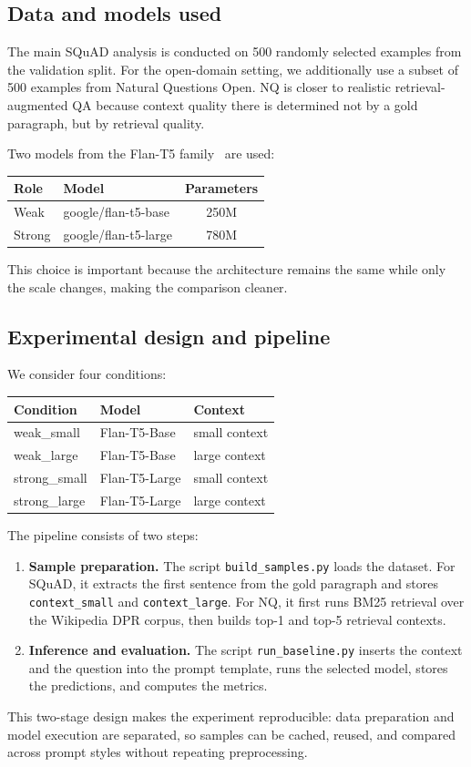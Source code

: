 \documentclass[a4paper,12pt]{article}
\begin{document}
\subsection{Data and models used}
The main SQuAD analysis is conducted on 500 randomly selected examples from the validation split. For the open-domain setting, we additionally use a subset of 500 examples from Natural Questions Open. NQ is closer to realistic retrieval-augmented QA because context quality there is determined not by a gold paragraph, but by retrieval quality.

Two models from the Flan-T5 family~\cite{flan} are used:
\begin{center}
\begin{tabular}{|l|l|c|}
\hline
Role & Model & Parameters \\
\hline
Weak & google/flan-t5-base & 250M \\
Strong & google/flan-t5-large & 780M \\
\hline
\end{tabular}
\end{center}
This choice is important because the architecture remains the same while only the scale changes, making the comparison cleaner.

\subsection{Experimental design and pipeline}
We consider four conditions:
\begin{center}
\begin{tabular}{|l|l|l|}
\hline
Condition & Model & Context \\
\hline
weak\_small & Flan-T5-Base & small context \\
weak\_large & Flan-T5-Base & large context \\
strong\_small & Flan-T5-Large & small context \\
strong\_large & Flan-T5-Large & large context \\
\hline
\end{tabular}
\end{center}

The pipeline consists of two steps:
\begin{enumerate}
    \item \textbf{Sample preparation.} The script \texttt{build\_samples.py} loads the dataset. For SQuAD, it extracts the first sentence from the gold paragraph and stores \texttt{context\_small} and \texttt{context\_large}. For NQ, it first runs BM25 retrieval over the Wikipedia DPR corpus, then builds top-1 and top-5 retrieval contexts.
    \item \textbf{Inference and evaluation.} The script \texttt{run\_baseline.py} inserts the context and the question into the prompt template, runs the selected model, stores the predictions, and computes the metrics.
\end{enumerate}
This two-stage design makes the experiment reproducible: data preparation and model execution are separated, so samples can be cached, reused, and compared across prompt styles without repeating preprocessing.
\end{document}
